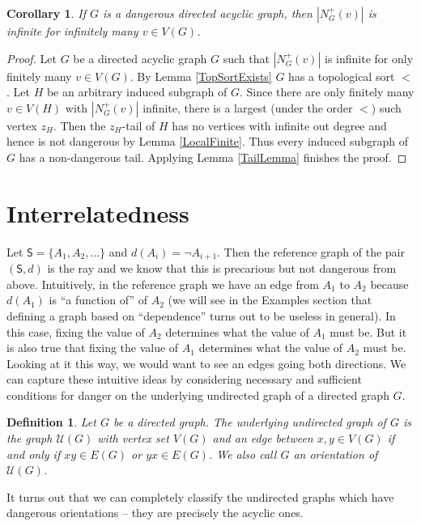 \documentclass[12pt]{article}
\newtheorem{cor}[thm]{Corollary}
\newtheorem{defn}{Definition}
\theoremstyle{remark}
\newcommand{\fancy}[1]{\mathcal{#1}}
\def\S{\textsf{S}}
\begin{document}
\begin{cor}\label{InfinitelyManyInfinite}
If $G$ is a dangerous directed acyclic graph, then $|N^{+}_G(v)|$ is infinite for infinitely many $v \in V(G)$.
\end{cor}
\begin{proof}
Let $G$ be a directed acyclic graph $G$ such that $|N^{+}_G(v)|$ is infinite for only finitely many $v \in V(G)$.  By Lemma \ref{TopSortExists} $G$ has a topological sort $<$.  Let $H$ be an arbitrary induced subgraph of $G$. Since there are only finitely many $v \in V(H)$ with $|N^{+}_G(v)|$ infinite, there is a largest (under the order $<$) such vertex $z_H$.  Then the $z_H$-tail of $H$ has no vertices with infinite out degree and hence is not dangerous by Lemma \ref{LocalFinite}.  Thus every induced subgraph of $G$ has a non-dangerous tail.  Applying Lemma \ref{TailLemma} finishes the proof.
\end{proof}

\section{Interrelatedness}
Let $\S = \{A_1, A_2, \ldots\}$ and $d(A_i) = \neg A_{i+1}$.  Then the reference graph of the pair $(\S, d)$ is the ray and we know that this is precarious but not dangerous from above.  Intuitively, in the reference graph we have an edge from $A_1$ to $A_2$ because $d(A_1)$ is ``a function of'' of $A_2$ (we will see in the Examples section that defining a graph based on ``dependence'' turns out to be useless in general). In this case, fixing the value of $A_2$ determines what the value of $A_1$ must be.  But it is also true that fixing the value of $A_1$ determines what the value of $A_2$ must be.  Looking at it this way, we would want to see an edges going both directions.  We can capture these intuitive ideas by considering necessary and sufficient conditions for danger on the underlying undirected graph of a directed graph $G$.

\begin{defn}
Let $G$ be a directed graph.  The \emph{underlying undirected graph} of $G$ is the graph $\fancy{U}(G)$ with vertex set $V(G)$ and an edge between $x, y \in V(G)$ if and only if $xy \in E(G)$ or $yx \in E(G)$.  We also call $G$ an \emph{orientation} of $\fancy{U}(G)$.
\end{defn}

It turns out that we can completely classify the undirected graphs which have dangerous orientations -- they are precisely the acyclic ones.  
\end{document}
